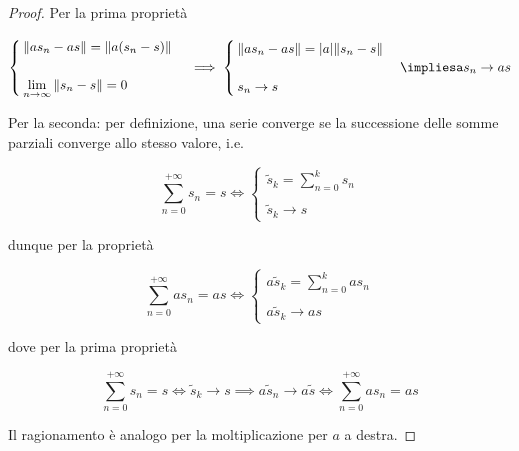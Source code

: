 \begin{proof}
	Per la prima proprietà
	
	\begin{equation}
		\begin{cases}
			\norm{a s_{n} - a s} = \norm{a (s_{n} - s)} \\\\
			\lim\limits_{n \to \infty} \norm{s_{n} - s} = 0
		\end{cases}
		\implies%
		\begin{cases}
			\norm{a s_{n} - a s} = \abs{a} \norm{s_{n} - s} \\\\
			s_{n} \to s
		\end{cases}
		\implies%
		a s_{n} \to a s
	\end{equation}

	Per la seconda: per definizione, una serie converge se la successione delle somme parziali converge allo stesso valore, i.e.
	
	\begin{equation}
		\sum_{n=0}^{+\infty} s_{n} = s %
		\iff %
		\begin{cases}
			\displaystyle \tilde{s}_{k} = \sum_{n=0}^{k} s_{n} \\\\
			\tilde{s}_{k} \to s
		\end{cases}
	\end{equation}

	dunque per la proprietà
	
	\begin{equation}
		\sum_{n=0}^{+\infty} a s_{n} = a s %
		\iff %
		\begin{cases}
			\displaystyle a \tilde{s}_{k} = \sum_{n=0}^{k} a s_{n} \\\\
			a \tilde{s}_{k} \to a s
		\end{cases}
	\end{equation}

	dove per la prima proprietà
	
	\begin{equation}
		\sum_{n=0}^{+\infty} s_{n} = s %
		\iff%
		\tilde{s}_{k} \to s%
		\implies%
		a \tilde{s}_{n} \to a \tilde{s} %
		\iff%
		\sum_{n=0}^{+\infty} a s_{n} = a s
	\end{equation}

	Il ragionamento è analogo per la moltiplicazione per $ a $ a destra.
\end{proof}

